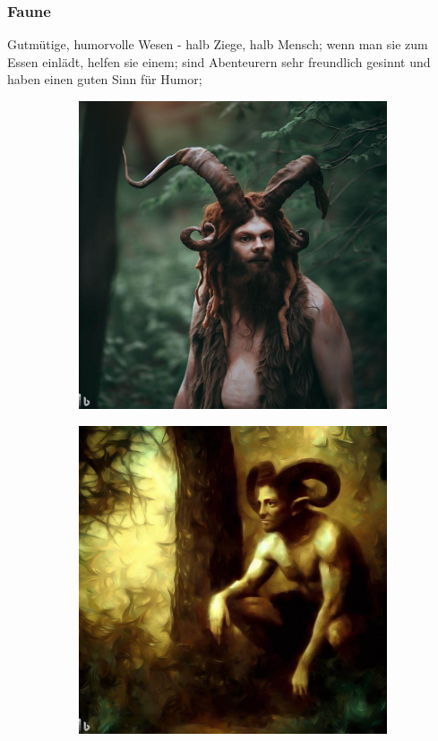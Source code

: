 \documentclass[11pt, twoside]{article}
\begin{document}
\subsubsection{Faune\label{faun}}
\label{sec:orga09f9dc}
Gutmütige, humorvolle Wesen - halb Ziege, halb Mensch; wenn man sie zum Essen einlädt, helfen sie einem; sind Abenteurern sehr freundlich gesinnt und haben einen guten Sinn für Humor;
\begin{figure}[H]
\centering
\caption{Faune}
\label{fig:faun}
  \begin{subfigure}{0.3\textwidth}
    \centering
    \includegraphics[width=0.99\linewidth]{faun1.jpeg}
  \end{subfigure}%
  \begin{subfigure}{0.3\textwidth}
    \centering
    \includegraphics[width=0.99\linewidth]{faun2.jpeg}

\end{subfigure}
\end{figure}
\end{document}
